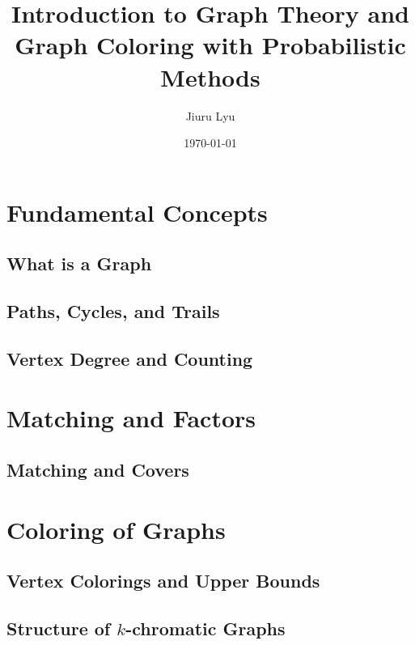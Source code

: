 \documentclass[12pt, letterpaper]{article}
\title{\textbf{Introduction to Graph Theory and Graph Coloring with Probabilistic Methods}}
\author{Jiuru Lyu}
\date{\today}
\begin{document}
\maketitle

\tableofcontents

\newpage
\section{Fundamental Concepts}
\subsection{What is a Graph}


\subsection{Paths, Cycles, and Trails}


\subsection{Vertex Degree and Counting}


\newpage
\section{Matching and Factors}

\subsection{Matching and Covers}


\newpage
\section{Coloring of Graphs}
\subsection{Vertex Colorings and Upper Bounds}
\subsection{Structure of $k$-chromatic Graphs}
\end{document}
